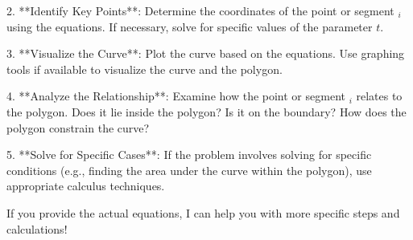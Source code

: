 2. **Identify Key Points**: Determine the coordinates of the point or segment \(_i\) using the equations. If necessary, solve for specific values of the parameter \(t\).

3. **Visualize the Curve**: Plot the curve based on the equations. Use graphing tools if available to visualize the curve and the polygon.

4. **Analyze the Relationship**: Examine how the point or segment \(_i\) relates to the polygon. Does it lie inside the polygon? Is it on the boundary? How does the polygon constrain the curve?

5. **Solve for Specific Cases**: If the problem involves solving for specific conditions (e.g., finding the area under the curve within the polygon), use appropriate calculus techniques.

If you provide the actual equations, I can help you with more specific steps and calculations!